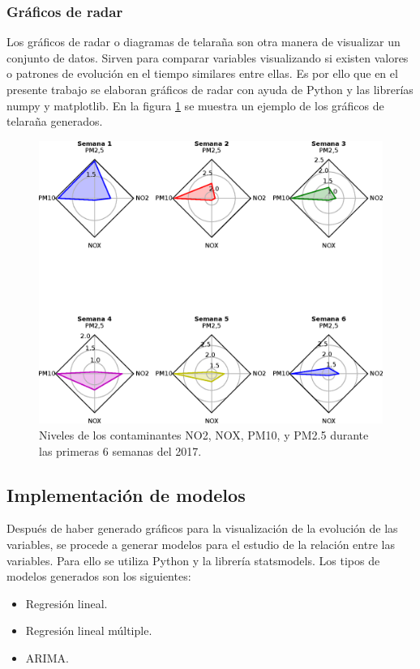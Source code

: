 \subsubsection{Gráficos de radar}
Los gráficos de radar o diagramas de telaraña son otra manera de visualizar un conjunto de datos. Sirven para comparar variables visualizando si existen valores o patrones de evolución en el tiempo similares entre ellas. Es por ello que en el presente trabajo se elaboran gráficos de radar con ayuda de Python y las librerías numpy y matplotlib. En la figura \ref{grafico_de_telaraña} se muestra un ejemplo de los gráficos de telaraña generados.
\begin{figure}[h!]
\setcounter{figure}{1} %
\captionsetup{type=figure} %
\begin{center}
   \includegraphics[width=1\textwidth]{Contaminantes-2017.eps}
   \end{center}
    \caption[Ejemplo de gráficos de radar]{Niveles de los contaminantes NO2, NOX, PM10, y PM2.5 durante las primeras 6 semanas del 2017.}
    \label{grafico_de_telaraña}
\end{figure}
\clearpage

\subsection{Implementación de modelos}
Después de haber generado gráficos para la visualización de la evolución de las variables, se procede a generar modelos para el estudio de la relación entre las variables. Para ello se utiliza Python y la librería statsmodels. Los tipos de modelos generados son los siguientes:
\begin{itemize}
	\item Regresión lineal.
	\item Regresión lineal múltiple.
	\item ARIMA.
\end{itemize}
\clearpage

